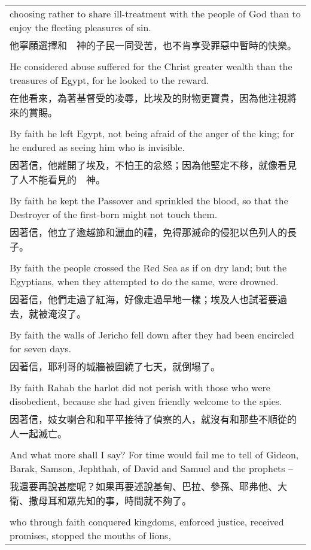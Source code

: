 \documentclass{book}
\begin{document}
\begin{tabularx}{\textwidth}{p{}}
choosing rather to share ill-treatment with the people of God than to enjoy the fleeting pleasures of sin. \\
他寧願選擇和　神的子民一同受苦，也不肯享受罪惡中暫時的快樂。 \\ \\
He considered abuse suffered for the Christ greater wealth than the treasures of Egypt, for he looked to the reward. \\
在他看來，為著基督受的凌辱，比埃及的財物更寶貴，因為他注視將來的賞賜。 \\ \\
By faith he left Egypt, not being afraid of the anger of the king; for he endured as seeing him who is invisible. \\
因著信，他離開了埃及，不怕王的忿怒；因為他堅定不移，就像看見了人不能看見的　神。 \\ \\
By faith he kept the Passover and sprinkled the blood, so that the Destroyer of the first-born might not touch them. \\
因著信，他立了逾越節和灑血的禮，免得那滅命的侵犯以色列人的長子。 \\ \\
By faith the people crossed the Red Sea as if on dry land; but the Egyptians, when they attempted to do the same, were drowned. \\
因著信，他們走過了紅海，好像走過旱地一樣；埃及人也試著要過去，就被淹沒了。 \\ \\
By faith the walls of Jericho fell down after they had been encircled for seven days. \\
因著信，耶利哥的城牆被圍繞了七天，就倒塌了。 \\ \\
By faith Rahab the harlot did not perish with those who were disobedient, because she had given friendly welcome to the spies. \\
因著信，妓女喇合和和平平接待了偵察的人，就沒有和那些不順從的人一起滅亡。 \\ \\
And what more shall I say? For time would fail me to tell of Gideon, Barak, Samson, Jephthah, of David and Samuel and the prophets -- \\
我還要再說甚麼呢？如果再要述說基甸、巴拉、參孫、耶弗他、大衛、撒母耳和眾先知的事，時間就不夠了。 \\ \\
who through faith conquered kingdoms, enforced justice, received promises, stopped the mouths of lions, \\

\end{tabularx}
\end{document}
